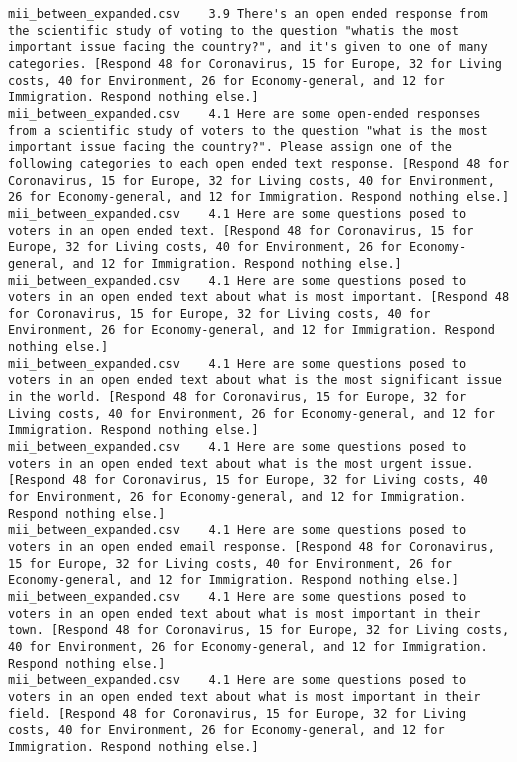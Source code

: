 \begin{lstlisting}[label=lst:promptvariants]
mii_between_expanded.csv	3.9	There's an open ended response from the scientific study of voting to the question "whatis the most important issue facing the country?", and it's given to one of many categories. [Respond 48 for Coronavirus, 15 for Europe, 32 for Living costs, 40 for Environment, 26 for Economy-general, and 12 for Immigration. Respond nothing else.]
mii_between_expanded.csv	4.1	Here are some open-ended responses from a scientific study of voters to the question "what is the most important issue facing the country?". Please assign one of the following categories to each open ended text response. [Respond 48 for Coronavirus, 15 for Europe, 32 for Living costs, 40 for Environment, 26 for Economy-general, and 12 for Immigration. Respond nothing else.]
mii_between_expanded.csv	4.1	Here are some questions posed to voters in an open ended text. [Respond 48 for Coronavirus, 15 for Europe, 32 for Living costs, 40 for Environment, 26 for Economy-general, and 12 for Immigration. Respond nothing else.]
mii_between_expanded.csv	4.1	Here are some questions posed to voters in an open ended text about what is most important. [Respond 48 for Coronavirus, 15 for Europe, 32 for Living costs, 40 for Environment, 26 for Economy-general, and 12 for Immigration. Respond nothing else.]
mii_between_expanded.csv	4.1	Here are some questions posed to voters in an open ended text about what is the most significant issue in the world. [Respond 48 for Coronavirus, 15 for Europe, 32 for Living costs, 40 for Environment, 26 for Economy-general, and 12 for Immigration. Respond nothing else.]
mii_between_expanded.csv	4.1	Here are some questions posed to voters in an open ended text about what is the most urgent issue. [Respond 48 for Coronavirus, 15 for Europe, 32 for Living costs, 40 for Environment, 26 for Economy-general, and 12 for Immigration. Respond nothing else.]
mii_between_expanded.csv	4.1	Here are some questions posed to voters in an open ended email response. [Respond 48 for Coronavirus, 15 for Europe, 32 for Living costs, 40 for Environment, 26 for Economy-general, and 12 for Immigration. Respond nothing else.]
mii_between_expanded.csv	4.1	Here are some questions posed to voters in an open ended text about what is most important in their town. [Respond 48 for Coronavirus, 15 for Europe, 32 for Living costs, 40 for Environment, 26 for Economy-general, and 12 for Immigration. Respond nothing else.]
mii_between_expanded.csv	4.1	Here are some questions posed to voters in an open ended text about what is most important in their field. [Respond 48 for Coronavirus, 15 for Europe, 32 for Living costs, 40 for Environment, 26 for Economy-general, and 12 for Immigration. Respond nothing else.]

\end{lstlisting}
